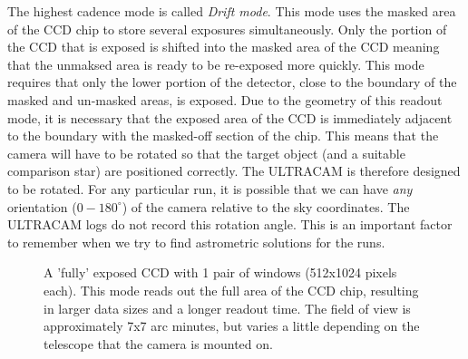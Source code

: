 The highest cadence mode is called \emph{Drift mode}. This mode uses the masked area of the CCD chip to store several exposures simultaneously. Only the portion of the CCD that is exposed is shifted into the masked area of the CCD meaning that the unmaksed area is ready to be re-exposed more quickly. This mode requires that only the lower portion of the detector, close to the boundary of the masked and un-masked areas, is exposed. Due to the geometry of this readout mode, it is necessary that the exposed area of the CCD is immediately adjacent to the boundary with the masked-off section of the chip. This means that the camera will have to be rotated so that the target object (and a suitable comparison star) are positioned correctly. The ULTRACAM is therefore designed to be rotated. For any particular run, it is possible that we can have \emph{any} orientation ($0-180^{\circ}$) of the camera relative to the sky coordinates. The ULTRACAM logs do not record this rotation angle. This is an important factor to remember when we try to find astrometric solutions for the runs.    

\begin{figure}
  \centering
  \setlength{\fboxsep}{0pt}
  \setlength{\fboxrule}{1pt}
  \caption{A 'fully' exposed CCD with 1 pair of windows (512x1024 pixels each).  This mode reads out the full area of the CCD chip, resulting in larger data sizes and a longer readout time. The field of view is approximately 7x7 arc minutes, but varies a little depending on the telescope that the camera is mounted on.}
  \label{fig:KOI-824}
\end{figure}

